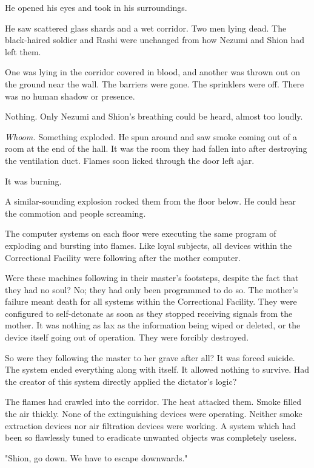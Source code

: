 He opened his eyes and took in his surroundings.

He saw scattered glass shards and a wet corridor. Two men lying dead.
The black-haired soldier and Rashi were unchanged from how Nezumi and
Shion had left them.

One was lying in the corridor covered in blood, and another was thrown
out on the ground near the wall. The barriers were gone. The sprinklers
were off. There was no human shadow or presence.

Nothing. Only Nezumi and Shion's breathing could be heard, almost too
loudly.

\emph{Whoom.} Something exploded. He spun around and saw smoke coming out of a
room at the end of the hall. It was the room they had fallen into after
destroying the ventilation duct. Flames soon licked through the door
left ajar.

It was burning.

A similar-sounding explosion rocked them from the floor below. He could
hear the commotion and people screaming.

The computer systems on each floor were executing the same program of
exploding and bursting into flames. Like loyal subjects, all devices
within the Correctional Facility were following after the mother
computer.

Were these machines following in their master's footsteps, despite the
fact that they had no soul? No; they had only been programmed to do so.
The mother's failure meant death for all systems within the Correctional
Facility. They were configured to self-detonate as soon as they stopped
receiving signals from the mother. It was nothing as lax as the
information being wiped or deleted, or the device itself going out of
operation. They were forcibly destroyed.

So were they following the master to her grave after all? It was forced
suicide. The system ended everything along with itself. It allowed
nothing to survive. Had the creator of this system directly applied the
dictator's logic?

The flames had crawled into the corridor. The heat attacked them. Smoke
filled the air thickly. None of the extinguishing devices were
operating. Neither smoke extraction devices nor air filtration devices
were working. A system which had been so flawlessly tuned to eradicate
unwanted objects was completely useless.

"Shion, go down. We have to escape downwards."

